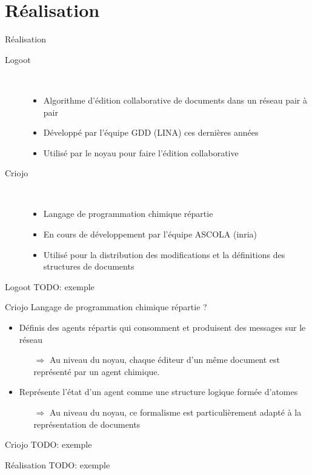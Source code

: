 \section{R\'ealisation}
\begin{frame}{Réalisation}
\begin{description}
\item [Logoot] ~ 
  \begin{itemize}
    \item Algorithme d'édition collaborative de documents dans un réseau
    pair à pair
    \item Développé par l'équipe GDD (LINA) ces dernières années
    \item Utilisé par le noyau pour faire l'édition collaborative
  \end{itemize}
\item [Criojo] ~
  \begin{itemize}
    \item Langage de programmation chimique répartie
    \item En cours de développement par l'équipe ASCOLA (inria)
    \item Utilisé pour la distribution des modifications et la définitions
    des structures de documents
  \end{itemize}
\end{description}
\end{frame}

\begin{frame}{Logoot}
TODO: exemple
\end{frame}

\begin{frame}{Criojo}
Langage de programmation chimique répartie ?
\begin{itemize}
  \item Définis des agents répartis qui consomment et produisent des messages
  sur le réseau
    \begin{itemize}
    \item [$\Rightarrow$] Au niveau du noyau, chaque éditeur d'un même document
    est représenté par un agent chimique.
    \end{itemize}
  \item Représente l'état d'un agent comme une structure logique formée d'atomes
    \begin{itemize}
    \item [$\Rightarrow$] Au niveau du noyau, ce formalisme est particulièrement
    adapté à la représentation de documents
    \end{itemize}
\end{itemize}
\end{frame}

\begin{frame}{Criojo}
TODO: exemple
\end{frame}

\begin{frame}{Réalisation}
TODO: exemple
\end{frame}


